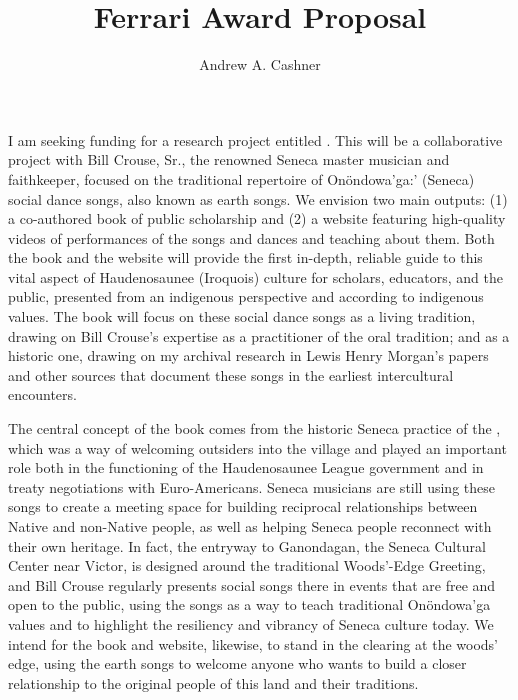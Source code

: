 \documentclass[12pt]{article}
\title{Ferrari Award Proposal}
\author{Andrew A. Cashner}
\begin{document}
\maketitle

I am seeking funding for a research project entitled .
This will be a collaborative project with Bill Crouse, Sr., the renowned
Seneca master musician and faithkeeper, focused on the traditional repertoire
of Onöndowa'ga:' (Seneca) social dance songs, also known as earth songs.
We envision two main outputs: (1) a co-authored book of public scholarship and
(2) a website featuring high-quality videos of performances of the songs and
dances and teaching about them.
Both the book and the website will provide the first in-depth, reliable
guide to this vital aspect of Haudenosaunee (Iroquois) culture for scholars,
educators, and the public, presented from an indigenous perspective and
according to indigenous values.  
The book will focus on these social dance songs as a living tradition, drawing
on Bill Crouse’s expertise as a practitioner of the oral tradition; and as a
historic one, drawing on my archival research in Lewis Henry Morgan’s papers
and other sources that document these songs in the earliest intercultural
encounters. 

The central concept of the book comes from the historic Seneca practice of the
, which was a way of welcoming outsiders into the
village and played an important role both in the functioning of the
Haudenosaunee League government and in treaty negotiations with
Euro-Americans.%
\Autocite{Richter:Ordeal}
Seneca musicians are still using these songs to create a meeting space for
building reciprocal relationships between Native and non-Native people, as
well as helping Seneca people reconnect with their own heritage.
In fact, the entryway to Ganondagan, the Seneca Cultural Center near Victor,
is designed around the traditional Woods'-Edge Greeting, and Bill Crouse
regularly presents social songs there in events that are free and open to the
public, using the songs as a way to teach traditional Onöndowa'ga values and
to highlight the resiliency and vibrancy of Seneca culture today.
We intend for the book and website, likewise, to stand in the clearing at the
woods' edge, using the earth songs to welcome anyone who wants to build a
closer relationship to the original people of this land and their traditions.
\end{document}
